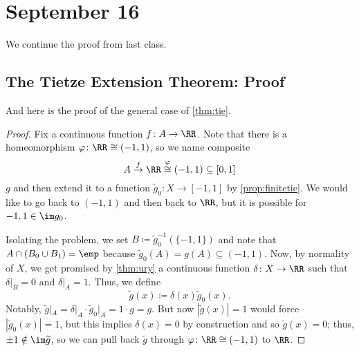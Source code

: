 \documentclass[../notes.tex]{subfiles}
\begin{document}
\section{September 16}

We continue the proof from last class.

\subsection{The Tietze Extension Theorem: Proof}
And here is the proof of the general case of \autoref{thm:tie}.
\tiethm*
\begin{proof}
	Fix a continuous function $f\colon A\to\RR$. Note that there is a homeomorphism $\varphi\colon\RR\cong(-1,1)$, so we name composite
	\[A\stackrel f\to\RR\stackrel\varphi\cong(-1,1)\subseteq[0,1]\]
	$g$ and then extend it to a function $\widetilde g_0\colon X\to[-1,1]$ by \autoref{prop:finitetie}. We would like to go back to $(-1,1)$ and then back to $\RR$, but it is possible for $-1,1\in\im g_0$.

	Isolating the problem, we set $B\coloneqq\widetilde g_0^{-1}(\{-1,1\})$ and note that $A\cap (B_0\cup B_1)=\emp$ because $\widetilde g_0(A)=g(A)\subseteq(-1,1)$. Now, by normality of $X$, we get promised by \autoref{thm:ury} a continuous function $\delta\colon X\to\RR$ such that $\delta|_B=0$ and $\delta|_A=1$. Thus, we define
	\[\widetilde g(x)\coloneqq\delta(x)\widetilde g_0(x).\]
	Notably, $\widetilde g|_A=\delta|_A\cdot\widetilde g_0|_A=1\cdot g=g$. But now $|\widetilde g(x)|=1$ would force $|\widetilde g_0(x)|=1$, but this implies $\delta(x)=0$ by construction and so $\widetilde g(x)=0$; thus, $\pm1\notin\im\widetilde g$, so we can pull back $\widetilde g$ through $\varphi\colon\RR\cong(-1,1)$ to $\RR$.
\end{proof}
\end{document}
